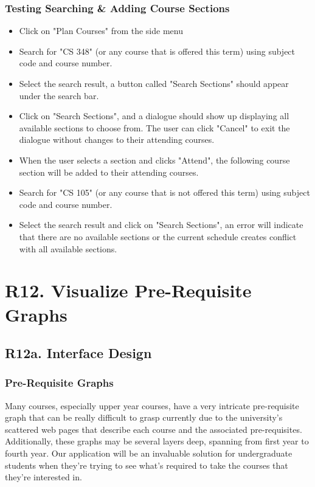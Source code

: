 \documentclass[12pt, a4paper]{article}
\begin{document}
\subsubsection*{Testing Searching \& Adding Course Sections}
\begin{itemize}
    \item Click on "Plan Courses" from the side menu
    \item Search for "CS 348" (or any course that is offered this term) using subject code and course number.
    \item Select the search result, a button called "Search Sections" should appear under the search bar.
    \item Click on "Search Sections", and a dialogue should show up displaying all available sections to choose from. The user can click "Cancel" to exit the dialogue without changes to their attending courses.
    \item When the user selects a section and clicks "Attend", the following course section will be added to their attending courses.
    \item Search for "CS 105" (or any course that is not offered this term) using subject code and course number.
    \item Select the search result and click on "Search Sections", an error will indicate that there are no available sections or the current schedule creates conflict with all available sections.
\end{itemize}
    
\section*{R12. Visualize Pre-Requisite Graphs}
\label{sec:R12}
\subsection*{R12a. Interface Design}
\subsubsection*{Pre-Requisite Graphs}
Many courses, especially upper year courses, have a very intricate pre-requisite graph that can be really difficult to grasp currently due to the university's scattered web pages that describe each course and the associated pre-requisites. Additionally, these graphs may be several layers deep, spanning from first year to fourth year. Our application will be an invaluable solution for undergraduate students when they're trying to see what's required to take the courses that they're interested in.\\
\end{document}
